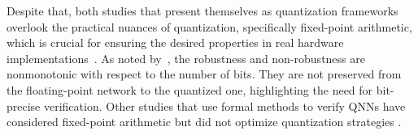 Despite that, both studies that present themselves as quantization frameworks overlook the practical nuances of quantization, specifically fixed-point arithmetic, which is crucial for ensuring the desired properties in real hardware implementations~\cite{han2020understanding}. As noted by~\cite{giacobbe2020how}, the robustness and non-robustness are  nonmonotonic with respect to the number of bits. They are not preserved from the floating-point network to the quantized one, highlighting the need for bit-precise verification. Other studies that use formal methods to verify QNNs have considered fixed-point arithmetic but did not optimize quantization strategies \cite{baranowski2020smt,song2023qnnrepair,amir2021smt}. 

